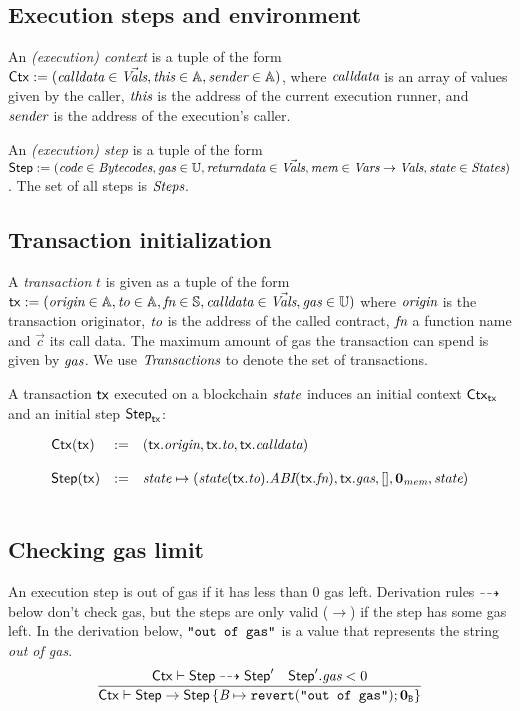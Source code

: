 \documentclass[12pt]{extarticle}
\begin{document}
\subsection{Execution steps and environment}

An \emph{(execution) context} is a tuple of the form $\mathsf{Ctx}:=(\textit{calldata}\in\vec{\textit{Vals}},\textit{this}\in\mathbb{A},\textit{sender}\in\mathbb{A})$, 
where $\textit{calldata}$ is an array of values given by the caller, $\textit{this}$ is the address of the current execution runner, 
and $\textit{sender}$ is the address of the execution's caller. 

An \emph{(execution) step} is a tuple of the form
$\mathsf{Step}:=(
    \textit{code}\in\textit{Bytecodes},
    \textit{gas}\in\mathbb{U},
    \textit{returndata}\in\vec{\textit{Vals}}, 
    \textit{mem}\in\textit{Vars}\to\textit{Vals}, 
    \textit{state}\in\textit{States}
)$. The set of all steps is $\textit{Steps}$.

\subsection{Transaction initialization}
A \emph{transaction} $t$ is given as a tuple of the form $\mathsf{tx}:=(\textit{origin}\in\mathbb{A},\textit{to}\in\mathbb{A},\textit{fn}\in\mathbb{S},\textit{calldata}\in\vec {\textit{Vals}}, \textit{gas}\in\mathbb{U})$ where $\textit{origin}$ is the transaction originator, $\textit{to}$ is the address of the called contract, $\textit{fn}$ a function name and $\vec c$ its call data. The maximum amount of gas the transaction can spend is given by $\textit{gas}$.
We use $\textit{Transactions}$ to denote the set of transactions.

A transaction $\mathsf{tx}$ executed on a blockchain $\textit{state}$ induces an initial context $\mathsf{Ctx}_{\mathsf{tx}}$ and an initial step $\mathsf{Step}_{\mathsf{tx}}$:

$$ \begin{array} {lll}
\mathsf{Ctx}(\mathsf{tx}) &:=& (\mathsf{tx}.\textit{origin},\mathsf{tx}.\textit{to},\mathsf{tx}.\textit{calldata})\\\\
\mathsf{Step}(\mathsf{tx})&:=& \textit{state} \mapsto (\textit{state}(\mathsf{tx}.\textit{to}).\textit{ABI}(\mathsf{tx}.\textit{fn}),\mathsf{tx}.\textit{gas}, [],\mathbf{0}_{\textit{mem}},\textit{state})\\\\
\end{array}$$



\subsection{Checking gas limit}
An execution step is out of gas if it has less than $0$ gas left. Derivation rules $\dashrightarrow$ below don't check gas, but the steps are only valid ($\rightarrow$) if the step has some gas left. In the derivation below, $\hbox{\rm\texttt{"out of gas"}}$ is a value that represents the string \emph{out of gas}.
\begin{equation}
\dfrac{
\mathsf{Ctx}\vdash\mathsf{Step}\dashrightarrow \mathsf{Step}' \quad \mathsf{Step}'.\textit{gas} < 0
}{
\mathsf{Ctx}\vdash\mathsf{Step}\to \mathsf{Step}\left\{\textit{B}\mapsto \mathtt{revert}(\hbox{\rm\texttt{"out of gas"}});\mathbf{0}_{\texttt{B}}\right\}
}
\end{equation}
\end{document}
